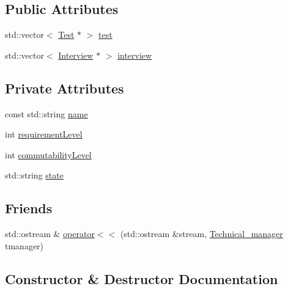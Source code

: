 \subsection*{Public Attributes}
\begin{DoxyCompactItemize}
\item 
std\+::vector$<$ \hyperlink{class_test}{Test} $\ast$ $>$ \hyperlink{class_technical__manager_a4bb774e21944be05309197d10dcba54e}{test}
\item 
std\+::vector$<$ \hyperlink{class_interview}{Interview} $\ast$ $>$ \hyperlink{class_technical__manager_af5aa30bc5574b94fd694d1927446b0ee}{interview}
\end{DoxyCompactItemize}
\subsection*{Private Attributes}
\begin{DoxyCompactItemize}
\item 
const std\+::string \hyperlink{class_technical__manager_a614ced849b0c26387b0d2fbb03a9a457}{name}
\item 
int \hyperlink{class_technical__manager_a86c6df435e9fb69acccbf1a8bdc22088}{requirement\+Level}
\item 
int \hyperlink{class_technical__manager_a42c180cd359d8c8c61d55aaeefeaf768}{commutability\+Level}
\item 
std\+::string \hyperlink{class_technical__manager_a94e93641fd9eb15afba421e2d79ebfce}{state}
\end{DoxyCompactItemize}
\subsection*{Friends}
\begin{DoxyCompactItemize}
\item 
std\+::ostream \& \hyperlink{class_technical__manager_a414b7f00e01c9ea9314ef822f5e6d34d}{operator$<$$<$} (std\+::ostream \&stream, \hyperlink{class_technical__manager}{Technical\+\_\+manager} tmanager)
\end{DoxyCompactItemize}


\subsection{Constructor \& Destructor Documentation}
\hypertarget{class_technical__manager_a41ead444e3dc90e801f5393da0494c5f}{}\label{class_technical__manager_a41ead444e3dc90e801f5393da0494c5f} 
